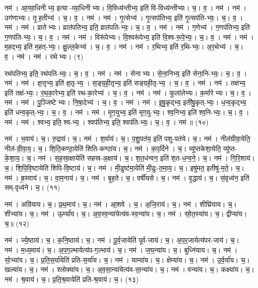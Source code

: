 नम॑। आ॒व्या॒धिनीभ्य॒ इत्या-व्या॒धिनीभ्यः। वि॒विध्य॑न्तीभ्य॒ इति॑ वि-विध्य॑न्तीभ्यः। च॒। व॒। नम॑। नम॑। उग॑णाभ्यः। तृ॒ह॒तीभ्य॑। च॒। व॒। नम॑। 
नम॑। गृ॒त्सेभ्य॑। गृ॒त्सप॑तिभ्य॒ इति॑ गृ॒त्सप॑ति-भ्यः॒। च॒। व॒। नम॑। 
नम॑। व्रातेभ्यः। व्रात॑पतिभ्य॒ इति॒ व्रात॑पति-भ्यः॒। च॒। व॒। नम॑। 
नम॑। ग॒णेभ्य॑। ग॒णप॑तिभ्य॒ इति॑ ग॒णप॑ति-भ्यः॒। च॒। व॒। नम॑। 
नम॑। विरू॑पेभ्यः। वि॒श्वरू॑पेभ्य॒ इति॑ वि॒श्व-रू॒पे॒भ्यः॒। च॒। व॒। नम॑। 
नम॑। म॒हद्भ्य॒ इति॑ म॒हत्-भ्यः॒। क्षु॒ल्ल॒केभ्य॑। च॒। व॒। नम॑। 
नम॑। र॒थिभ्य॒ इति॑ र॒थि-भ्यः॒। अ॒र॒थेभ्य॑। च॒। व॒। नम॑। 
नम॑। रथेभ्यः। (९)


रथ॑पतिभ्य॒ इति॒ रथ॑पति-भ्यः॒। च॒। व॒। नम॑। 
नम॑। सेनाभ्यः। से॒ना॒निभ्य॒ इति॑ सेना॒नि-भ्यः॒। च॒। व॒। नम॑। 
नम॑। क्ष॒त्तृभ्य॒ इति॑ क्ष॒तृ-भ्य॒। स॒ङ्ग्र॒ही॒तृभ्य॒ इति॑ सङ्ग्रही॒तृ-भ्य॒। च॒। व॒। नम॑। 
नम॑। तक्ष॑भ्य॒ इति॑ तक्ष॑-भ्यः॒। र॒थ॒का॒रेभ्य॒ इति॑ रथ-का॒रेभ्य॑। च॒। व॒। नम॑। 
नम॑। कुला॑लेभ्यः। क॒र्मारेभ्यः। च॒। व॒। नम॑। 
नम॑। पु॒ञ्जिष्टेभ्यः। नि॒षा॒देभ्य॑। च॒। व॒। नम॑। 
नम॑। इ॒षु॒कृद्भ्य॒ इती॑षु॒कृत्-भ्यः॒। ध॒न्व॒कृद्भ्य॒ इति॑ धन्व॒कृत्-भ्यः॒। च॒। व॒। नम॑। 
नम॑। मृ॒ग॒युभ्य॒ इति॑ मृग॒यु-भ्यः॒। श्व॒निभ्य॒ इति॑ श्व॒नि-भ्यः॒। च॒। व॒। नम॑। 
नम॑। श्वभ्य॒ इति॒ श्व-भ्य॒। श्वप॑तिभ्य॒ इति॒ श्वप॑ति-भ्यः॒। च॒। व॒। नम॑॥ (१०)


नम॑। भ॒वाय॑। च॒। रु॒द्राय॑। च॒। 
नम॑। श॒र्वाय॑। च॒। प॒शु॒पत॑य॒ इति॑ पशु-पत॑ये। च॒। 
नम॑। नील॑ग्रीवा॒येति॒ नील॑-ग्री॒वा॒य॒। च॒। शि॒ति॒कण्ठा॒येति॑ शिति-कण्ठा॑य। च॒। 
नम॑। क॒प॒र्दिने। च॒। व्यु॑प्तकेशा॒येति॒ व्यु॑प्त-के॒शा॒य॒। च॒। 
नम॑। स॒ह॒स्रा॒क्षायेति॑ सहस्र-अ॒क्षाय॑। च॒। श॒त॒ध॑न्वन॒ इति॑ श॒त-ध॒न्व॒ने॒। च॒। 
नम॑। गि॒रि॒शाय॑। च॒। शि॒पि॒वि॒ष्टायेति॑ शिपि-वि॒ष्टाय॑। च॒। 
नम॑। मी॒ढुष्ट॑मा॒येति॑ मी॒ढुः-त॒मा॒य॒। च॒। इषु॑मत॒ इतीषु॑-म॒ते॒। च॒। 
नम॑। ह्र॒स्वाय॑। च॒। वा॒म॒नाय॑। च॒। 
नम॑। बृ॒ह॒ते। च॒। वर्षी॑यसे। च॒। 
नम॑। वृ॒द्धाय॑। च॒। सं॒वृध्व॑न॒ इति॑ सम्-वृध्व॑ने। च॒। (११)


नम॑। अग्रि॑याय। च॒। प्र॒थ॒माय॑। च॒। 
नम॑। आ॒शवे। च॒। अ॒जि॒राय॑। च॒। 
नम॑। शीघ्रि॑याय। च॒। शीभ्या॑य। च॒। 
नम॑। ऊ॒र्म्या॑य। च॒। अ॒व॒स्व॒न्या॑येत्य॑व-स्व॒न्या॑य। च॒। 
नम॑। स्रो॒त॒स्या॑य। च॒। द्वीप्या॑य। च॒॥ (१२)


नम॑। ज्ये॒ष्ठाय॑। च॒। क॒नि॒ष्ठाय॑। च॒। 
नम॑। पू॒र्व॒जायेति॑ पूर्व-जाय॑। च॒। अ॒प॒र॒जायेत्य॑पर-जाय॑। च॒। 
नम॑। म॒ध्य॒माय॑। च॒। अ॒प॒ग॒ल्भायेत्य॑प-ग॒ल्भाय॑। च॒। 
नम॑। ज॒घ॒न्या॑य। च॒। बुध्नि॑याय। च॒। 
नम॑। सो॒भ्या॑य। च॒। प्र॒ति॒स॒र्या॑येति॑ प्रति-स॒र्या॑य। च॒। 
नम॑। याम्या॑य। च॒। क्षेम्या॑य। च॒। 
नम॑। उ॒र्व॒र्या॑य। च॒। खल्या॑य। च॒। 
नम॑। श्लोक्या॑य। च॒। अ॒व॒सा॒न्या॑येत्य॑व-सा॒न्या॑य। च॒। 
नम॑। वन्या॑य। च॒। कक्ष्या॑य। च॒। 
नम॑। श्र॒वाय॑। च॒। प्र॒ति॒श्र॒वायेति॑ प्रति-श्र॒वाय॑। च॒। (१३)



